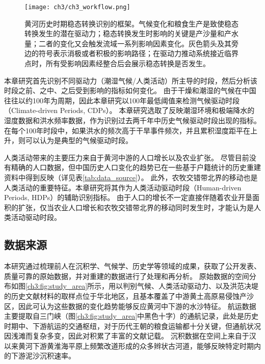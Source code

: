 \begin{figure}[!h] %
    \centering
    \texttt{[image: ch3/ch3\_workflow.png]}
    \caption[黄河历史时期水沙特征的稳态转换识别框架]{黄河历史时期稳态转换识别的框架。气候变化和粮食生产是致使稳态转换发生的潜在驱动力；稳态转换发生时影响的关键是产沙量和产水量；二者的变化又会触发流域一系列影响因素变化。灰色箭头及其旁边的符号表示消极或者积极的影响路径；在驱动力推动系统接近临界点时，所有受影响因素经整合后会展示稳态转换是否发生。}\label{fig:ch3:regime_shift_detect}
\end{figure}


本章研究首先识别不同驱动力（潮湿气候/人类活动）所主导的时段，然后分析该时段之前、之中、之后受到影响的指标如何变化。
由于干燥和潮湿的气候在中国往往以约100年为周期\cite{GeQuanSheng2011}，因此本章研究以100年最低阈值来检测气候驱动时段（Climate-driven Periods, CDPs）。
本章研究选取了反映潮湿环境和极端降水的湿度数据和洪水频率数据，作为识别过去两千年中历史气候驱动时段出现的指标。
在每个100年时段中，如果洪水的频次高于干旱事件频次，并且累积湿度距平在上升，则可以认为是典型的气候驱动时段。

人类活动带来的主要压力来自于黄河中游的人口增长以及农业扩张。
尽管目前没有精确的人口数据，但中国历史人口变化的趋势已在一些基于户籍统计的历史重建资料中得到反映（详见表\ref{tab:data_source}）。
此外，农牧交错带北界的移动也是人类活动的重要特征。本章研究将其作为人类活动驱动时段（Human-driven Periods, HDPs）的辅助识别指标。
由于人口的增长不一定直接伴随着农业开垦面积的扩张，仅当农业人口增长和农牧交错带北界的移动同时发生时，才能认为是人类活动驱动时段。

\subsection{数据来源}

本研究通过梳理前人在沉积学、气候学、历史学等领域的成果，获取了公开发表、质量可靠的原始数据，并对重建的数据进行了处理和再分析。
原始数据的空间分布如图\ref{ch3:fig:study_area}所示，用以判别气候、人类活动驱动力、以及洪范决堤的历史文献材料的取样点位于华北地区，且基本覆盖了中游黄土高原易侵蚀产沙区，因此可认为这些数据的变化趋势能够反应黄河中下游的水沙特征。
航运数据主要提取自三门峡（图\ref{ch3:fig:study_area}中黑色十字）的通航记录，此处是历史时期中、下游航运的交通枢纽，对于历代王朝的粮食运输都十分关键，但通航状况因浅滩而复杂多变，因此对积累了丰富的文献记载。
沉积数据在空间上来自于汉以来黄河下游黄淮海平原上频繁改道形成的众多辫状古河道\cite{shaoshixiong1989}，能够反映特定时期内的下游泥沙沉积速率。

